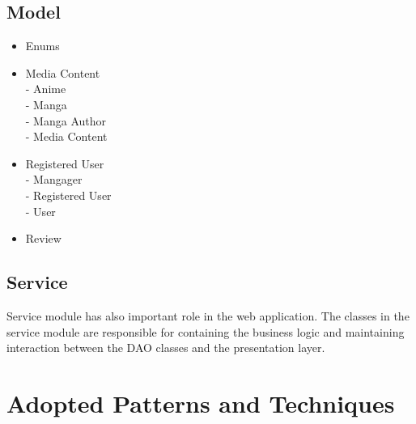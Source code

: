 \subsection*{Model}
\begin{itemize}
    \item Enums
    \item Media Content \\
    - Anime\\
    - Manga \\
    - Manga Author \\
    - Media Content
    \item Registered User\\
    - Mangager\\
    - Registered User\\
    - User
    \item Review 
\end{itemize}

\subsection*{Service}
Service module has also important role in the web application. The classes in the service module are responsible for containing
the business logic and maintaining interaction between the DAO classes and the presentation layer. 




\section{Adopted Patterns and Techniques}

